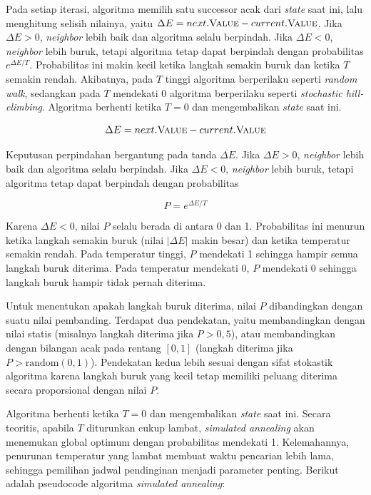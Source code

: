 Pada setiap iterasi, algoritma memilih satu successor acak dari \textit{state} saat ini, lalu menghitung selisih nilainya, yaitu $\Delta E = next.\textsc{Value} - current.\textsc{Value}$. Jika $\Delta E > 0$, \textit{neighbor} lebih baik dan algoritma selalu berpindah. Jika $\Delta E < 0$, \textit{neighbor} lebih buruk, tetapi algoritma tetap dapat berpindah dengan probabilitas $e^{\Delta E / T}$. Probabilitas ini makin kecil ketika langkah semakin buruk dan ketika $T$ semakin rendah. Akibatnya, pada $T$ tinggi algoritma berperilaku seperti \textit{random walk}, sedangkan pada $T$ mendekati 0 algoritma berperilaku seperti \textit{stochastic hill-climbing}. Algoritma berhenti ketika $T = 0$ dan mengembalikan \textit{state} saat ini.

\begin{equation}
    \Delta E = next.\textsc{Value} - current.\textsc{Value}
\end{equation}

Keputusan perpindahan bergantung pada tanda $\Delta E$. Jika $\Delta E > 0$, \textit{neighbor} lebih baik dan algoritma selalu berpindah. Jika $\Delta E < 0$, \textit{neighbor} lebih buruk, tetapi algoritma tetap dapat berpindah dengan probabilitas

\begin{equation}
    P = e^{\Delta E / T}
\end{equation}

Karena $\Delta E < 0$, nilai $P$ selalu berada di antara 0 dan 1. Probabilitas ini menurun ketika langkah semakin buruk (nilai $|\Delta E|$ makin besar) dan ketika temperatur semakin rendah. Pada temperatur tinggi, $P$ mendekati 1 sehingga hampir semua langkah buruk diterima. Pada temperatur mendekati 0, $P$ mendekati 0 sehingga langkah buruk hampir tidak pernah diterima.

Untuk menentukan apakah langkah buruk diterima, nilai $P$ dibandingkan dengan suatu nilai pembanding. Terdapat dua pendekatan, yaitu membandingkan dengan nilai statis (misalnya langkah diterima jika $P > 0{,}5$), atau membandingkan dengan bilangan acak pada rentang $[0,1]$ (langkah diterima jika $P > \text{random}(0,1)$). Pendekatan kedua lebih sesuai dengan sifat stokastik algoritma karena langkah buruk yang kecil tetap memiliki peluang diterima secara proporsional dengan nilai $P$.

Algoritma berhenti ketika $T = 0$ dan mengembalikan \textit{state} saat ini. Secara teoritis, apabila $T$ diturunkan cukup lambat, \textit{simulated annealing} akan menemukan global optimum dengan probabilitas mendekati 1. Kelemahannya, penurunan temperatur yang lambat membuat waktu pencarian lebih lama, sehingga pemilihan jadwal pendinginan menjadi parameter penting. Berikut adalah pseudocode algoritma \textit{simulated annealing}:

